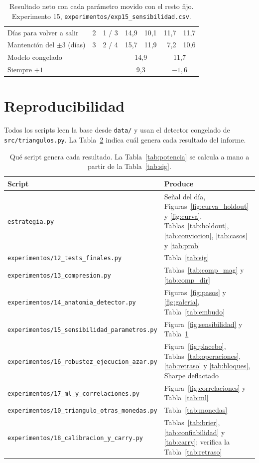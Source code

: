 \documentclass[10pt,a4paper]{article}
\newcommand{\ruta}[1]{\nolinkurl{#1}}
\begin{document}
\begin{table}[H]
\begin{tabular}{@{}lrrrrrr@{}}
Días para volver a salir          & 2    & 1 / 3       & 14,9 & 10,1 & 11,7 & 11,7 \\
Mantención del $\pm3$ (días)      & 3    & 2 / 4       & 15,7 & 11,9 & 7,2  & 10,6 \\
\midrule
Modelo congelado                  &      &             & \multicolumn{2}{c}{14,9} & \multicolumn{2}{c}{11,7} \\
Siempre $+1$                      &      &             & \multicolumn{2}{c}{9,3}  & \multicolumn{2}{c}{$-1{,}6$} \\
\bottomrule
\end{tabular}
\caption{Resultado neto con cada parámetro movido con el resto fijo. Experimento 15,
\texttt{experimentos/exp15\_sensibilidad.csv}.}\label{tab:sens_completa}
\end{table}

\section{Reproducibilidad}\label{app:reproducir}

Todos los scripts leen la base desde \texttt{data/} y usan el detector congelado de
\texttt{src/triangulos.py}. La Tabla~\ref{tab:scripts} indica cuál genera cada
resultado del informe.

\begin{table}[H]\centering\small
\renewcommand{\arraystretch}{1.08}
\begin{tabularx}{\textwidth}{@{}lX@{}}
\toprule
Script & Produce \\
\midrule
\texttt{estrategia.py} & Señal del día, Figuras~\ref{fig:curva_holdout} y \ref{fig:curva}, Tablas~\ref{tab:holdout}, \ref{tab:conviccion}, \ref{tab:casos} y \ref{tab:prob} \\
\ruta{experimentos/12_tests_finales.py} & Tabla~\ref{tab:sig} \\
\ruta{experimentos/13_compresion.py} & Tablas~\ref{tab:comp_mag} y \ref{tab:comp_dir} \\
\ruta{experimentos/14_anatomia_detector.py} & Figuras~\ref{fig:pasos} y \ref{fig:galeria}, Tabla~\ref{tab:embudo} \\
\ruta{experimentos/15_sensibilidad_parametros.py} & Figura~\ref{fig:sensibilidad} y Tabla~\ref{tab:sens_completa} \\
\ruta{experimentos/16_robustez_ejecucion_azar.py} & Figura~\ref{fig:placebo}, Tablas~\ref{tab:operaciones}, \ref{tab:retraso} y \ref{tab:bloques}, Sharpe deflactado \\
\ruta{experimentos/17_ml_y_correlaciones.py} & Figura~\ref{fig:correlaciones} y Tabla~\ref{tab:ml} \\
\ruta{experimentos/10_triangulo_otras_monedas.py} & Tabla~\ref{tab:monedas} \\
\ruta{experimentos/18_calibracion_y_carry.py} & Tablas~\ref{tab:brier}, \ref{tab:confiabilidad} y \ref{tab:carry}; verifica la Tabla~\ref{tab:retraso} \\
\bottomrule
\end{tabularx}
\caption{Qué script genera cada resultado. La Tabla~\ref{tab:potencia} se calcula a mano
a partir de la Tabla~\ref{tab:sig}.}\label{tab:scripts}
\end{table}
\end{document}
